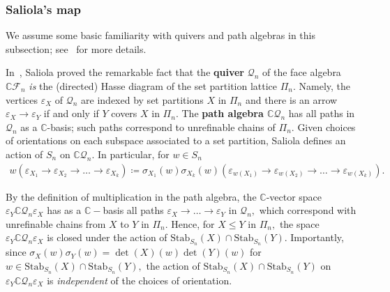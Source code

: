 \documentclass[ALCO, Unicode]{cedram}
\def\C{{\mathbb{C}}}
\def\stab{\mathrm{Stab}}
\begin{document}
\subsubsection{Saliola's map}\label{sec:Saliola'smap} We assume some basic familiarity with quivers and path algebras in this subsection; see~\cite[\S 3]{saliolaquiverdescalgebra} for more details.

In~\cite{saliolaquiverdescalgebra, saliolafacealgebra}, Saliola proved the remarkable fact that the \textbf{quiver} \textbf{$\mathcal{Q}_n$} of the face algebra  $\C \mathcal{F}_n$ \textit{is} the (directed) Hasse diagram of the set partition lattice $\Pi_n$. Namely, the vertices \textbf{$\varepsilon_X$} of $\mathcal{Q}_n$ are indexed by set partitions $X$ in $\Pi_n$ and there is an arrow $\varepsilon_X \to \varepsilon_Y$ if and only if $Y$ covers $X$ in $\Pi_n.$ The \textbf{path algebra $\C \mathcal{Q}_n$} has all paths in $\mathcal{Q}_n$ as a $\C$-basis; such paths correspond to unrefinable chains of $\Pi_n.$  Given choices of orientations on each subspace associated to a set partition, Saliola defines an action of $S_n$ on $\C \mathcal{Q}_n.$ In particular, for $w \in S_n$
\begin{align}\label{eqn:quiver-action}
    w\left(\varepsilon_{X_1} \to \varepsilon_{X_2} \to \ldots \to \varepsilon_{X_k}\right)  \coloneqq  \sigma_{X_1}(w)\sigma_{X_k}(w)\left(\varepsilon_{w\left(X_1\right)} \to \varepsilon_{w \left(X_2\right)} \to \ldots \to \varepsilon_{w \left(X_k\right)}\right).
\end{align}

 By the definition of multiplication in the path algebra, the $\C$-vector space $\varepsilon_Y \C \mathcal{Q}_n \varepsilon_X$ has as a $\C-$basis all paths $\varepsilon_X \to \ldots  \to \varepsilon_Y$ in $\mathcal{Q}_n,$ which correspond with unrefinable chains from $X$ to $Y$ in $\Pi_n.$ Hence, for $X \leq Y$ in $\Pi_n,$ the space $\varepsilon_Y \C \mathcal{Q}_n \varepsilon_X$ is closed under the action of $\stab_{S_n}(X) \cap \stab_{S_n}(Y).$ Importantly, since $\sigma_X(w)\sigma_Y(w) = \det(X)(w)\det(Y)(w)$ for $w \in \stab_{S_n}(X) \cap \stab_{S_n}(Y),$ the action of $\stab_{S_n}(X) \cap \stab_{S_n}(Y)$ on $\varepsilon_Y \C \mathcal{Q}_n \varepsilon_X$ is \textit{independent} of the choices of orientation.
\end{document}
